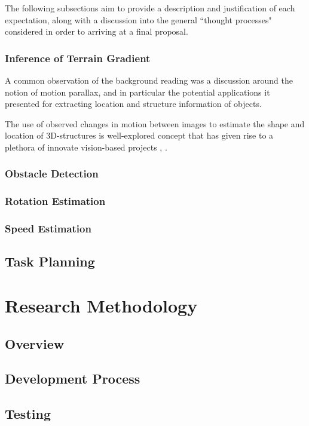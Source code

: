 The following subsections aim to provide a description and justification of each expectation, along with a discussion into the general ``thought processes" considered in order to arriving at a final proposal.

\subsubsection{Inference of Terrain Gradient}

A common observation of the background reading was a discussion around the notion of motion parallax, and in particular the potential applications it presented for extracting location and structure information of objects. 

The use of observed changes in motion between images to estimate the shape and location of 3D-structures is well-explored concept that has given rise to a plethora of innovate vision-based projects \cite{tiddeman}, \cite{snavely}.

\subsubsection{Obstacle Detection}

\subsubsection{Rotation Estimation}

\subsubsection{Speed Estimation}


\subsection{Task Planning}

%
%



\section{Research Methodology}

\subsection{Overview}

\subsection{Development Process}

\subsection{Testing}





